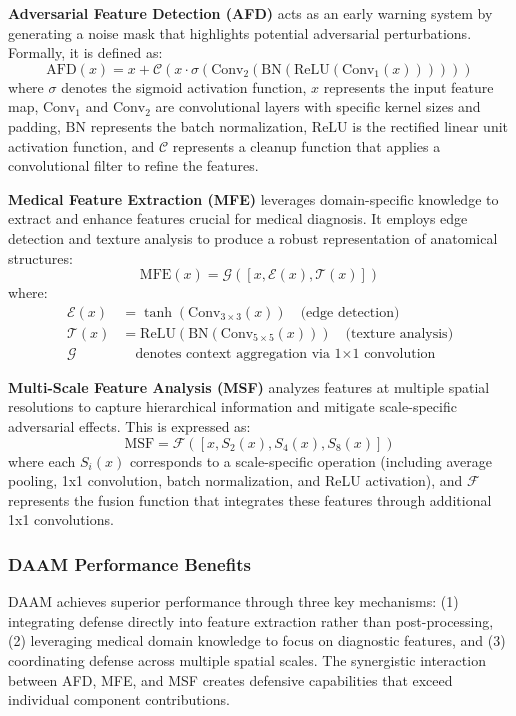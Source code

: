 \documentclass[preprint,12pt]{elsarticle}
\begin{document}
\textbf{Adversarial Feature Detection (AFD)} acts as an early warning system by generating a noise mask that highlights potential adversarial perturbations\cite{Rossolini24}. Formally, it is defined as:
\begin{equation}
\text{AFD}(x) = x + \mathcal{C}(x \cdot \sigma(\text{Conv}_2(\text{BN}(\text{ReLU}(\text{Conv}_1(x))))))
\end{equation}
where $\sigma$ denotes the sigmoid activation function, $x$ represents the input feature map, $\text{Conv}_1$ and $\text{Conv}_2$ are convolutional layers with specific kernel sizes and padding, $\text{BN}$ represents the batch normalization, $\text{ReLU}$ is the rectified linear unit activation function, and $\mathcal{C}$ represents a cleanup function that applies a convolutional filter to refine the features.

\textbf{Medical Feature Extraction (MFE)} leverages domain-specific knowledge to extract and enhance features crucial for medical diagnosis\cite{Woo18}. It employs edge detection and texture analysis to produce a robust representation of anatomical structures:
\begin{equation}
\text{MFE}(x) = \mathcal{G}([x, \mathcal{E}(x), \mathcal{T}(x)])
\end{equation}
where:
\begin{align}
\mathcal{E}(x) &= \tanh(\text{Conv}_{3 \times 3}(x)) \quad \text{(edge detection)} \\
\mathcal{T}(x) &= \text{ReLU}(\text{BN}(\text{Conv}_{5 \times 5}(x))) \quad \text{(texture analysis)} \\
\mathcal{G} &\quad \text{denotes context aggregation via 1×1 convolution}
\end{align}

\textbf{Multi-Scale Feature Analysis (MSF)} analyzes features at multiple spatial resolutions to capture hierarchical information and mitigate scale-specific adversarial effects\cite{Rossolini24}. This is expressed as:
\begin{equation}
\text{MSF} = \mathcal{F}([x, S_2(x), S_4(x), S_8(x)])
\end{equation}
where each $S_i(x)$ corresponds to a scale-specific operation (including average pooling, 1x1 convolution, batch normalization, and ReLU activation), and $\mathcal{F}$ represents the fusion function that integrates these features through additional 1x1 convolutions.

\subsubsection{DAAM Performance Benefits}
DAAM achieves superior performance through three key mechanisms: (1) integrating defense directly into feature extraction rather than post-processing, (2) leveraging medical domain knowledge to focus on diagnostic features, and (3) coordinating defense across multiple spatial scales. The synergistic interaction between AFD, MFE, and MSF creates defensive capabilities that exceed individual component contributions.
\end{document}
